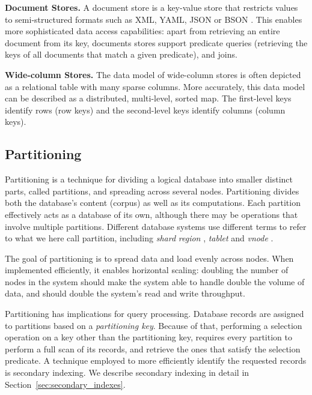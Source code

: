 \bigskip
\noindent
\textbf{Document Stores.}
A document store is a key-value store that restricts values to semi-structured formats such as
XML, YAML, JSON or BSON \cite{bson:spec}.
This enables more sophisticated data access capabilities:
apart from retrieving an entire document from its key, documents stores support predicate queries
(retrieving the keys of all documents that match a given predicate), and joins.

\bigskip
\noindent
\textbf{Wide-column Stores.}
The data model of wide-column stores is often depicted as a relational table with many sparse columns.
More accurately, this data model can be described as a distributed, multi-level, sorted map.
The first-level keys identify rows (row keys) and the second-level keys identify columns (column keys).

\subsection{Partitioning}
\label{sec:partitioning}

Partitioning is a technique for dividing a logical database into smaller distinct parts, called partitions, and spreading
across several nodes.
Partitioning divides both the database's content (corpus) as well as its computations.
Each partition effectively acts as a database of its own, although there may be operations that involve multiple partitions.
Different database systems use different terms to refer to what we here call partition, including \textit{shard} \cite{mongo:shards, elastic:shards}
\textit{region} \cite{hbase:regions}, \textit{tablet} \cite{bigtable:tablets} and \textit{vnode} \cite{cassandra:vnodes, riak:vnodes}.

The goal of partitioning is to spread data and load evenly across nodes.
When implemented efficiently, it enables horizontal scaling:
doubling the number of nodes in the system should make the system able to handle double the volume of data, and
should double the system's read and write throughput.

Partitioning has implications for query processing.
Database records are assigned to partitions based on a \textit{partitioning key}.
Because of that, performing a selection operation on a key other than the partitioning key,
requires every partition to perform a full scan of its records, and retrieve the ones that satisfy the selection predicate.
A technique employed to more efficiently identify the requested records is secondary indexing.
We describe secondary indexing in detail in Section~\ref{sec:secondary_indexes}.

